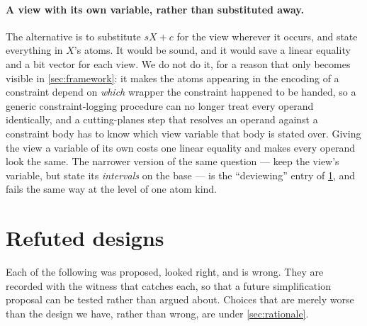 \documentclass[11pt,a4paper]{article}
\theoremstyle{plain}
\theoremstyle{definition}
\theoremstyle{remark}
\begin{document}
\paragraph{A view with its own variable, rather than substituted away.}
The alternative is to substitute $sX+c$ for the view wherever it occurs, and
state everything in $X$'s atoms.  It would be sound, and it would save a linear
equality and a bit vector for each view.  We do not do it, for a reason that only
becomes visible in \cref{sec:framework}: it makes the atoms appearing in the
encoding of a constraint depend on \emph{which} wrapper the constraint happened
to be handed, so a generic constraint-logging procedure can no longer treat every
operand identically, and a cutting-planes step that resolves an operand against a
constraint body has to know which view variable that body is stated over.  Giving
the view a variable of its own costs one linear equality and makes every operand
look the same.  The narrower version of the same question --- keep the view's
variable, but state its \emph{intervals} on the base --- is the ``deviewing''
entry of \cref{sec:refuted}, and fails the same way at the level of one atom
kind.

\section{Refuted designs}
\label{sec:refuted}

Each of the following was proposed, looked right, and is wrong.  They are
recorded with the witness that catches each, so that a future simplification
proposal can be tested rather than argued about.  Choices that are merely worse
than the design we have, rather than wrong, are under \cref{sec:rationale}.
\end{document}
